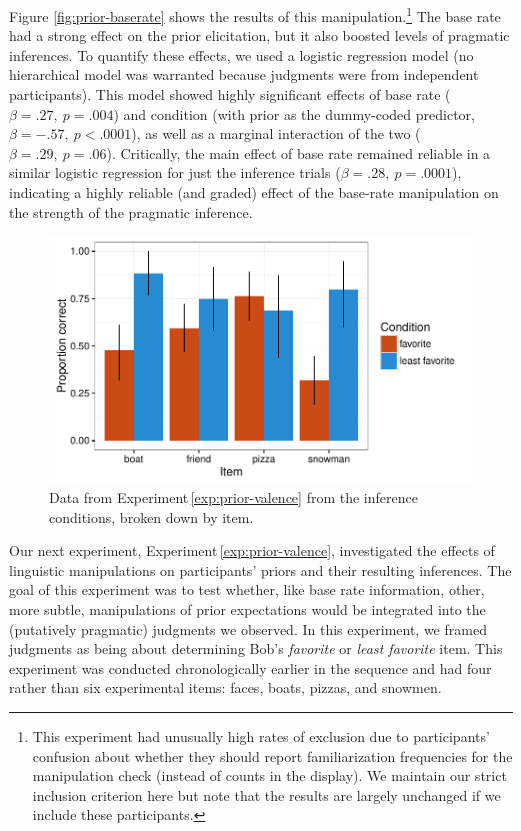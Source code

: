 \documentclass[man,noapacite]{apa2}
\newcounter{Experiment}
\newcommand{\exptref}[1]{Experiment\,\ref{#1}}
\begin{document}
Figure \ref{fig:prior-baserate} shows the results of this manipulation.\footnote{This experiment had unusually high rates of exclusion due to participants' confusion about whether they should report familiarization frequencies for the manipulation check (instead of counts in the display). We maintain our strict inclusion criterion here but note that the results are largely unchanged if we include these participants.}  The base rate had a strong effect on the prior elicitation, but it also boosted levels of pragmatic inferences. To quantify these effects, we used a logistic regression model (no hierarchical model was warranted because judgments were from independent participants). This model showed highly significant effects of base rate ($\beta = .27,~p = .004$) and condition (with prior as the dummy-coded predictor, $\beta = -.57,~p < .0001$), as well as a marginal interaction of the two  ($\beta = .29,~p = .06$). Critically, the main effect of base rate remained reliable in a similar logistic regression for just the inference trials ($\beta = .28,~p = .0001$), indicating a highly reliable (and graded) effect of the base-rate manipulation on the strength of the pragmatic inference.


\begin{figure}[t]
  \centering
  \includegraphics[width=6in]{../plots/2-prior-valence-items.pdf}
  \caption{\label{fig:prior-valence} Data from \exptref{exp:prior-valence} from the inference conditions, broken down by item.}
\end{figure}

Our next experiment, \exptref{exp:prior-valence}, investigated the effects of linguistic manipulations on participants' priors and their resulting inferences. The goal of this experiment was to test whether, like base rate information, other, more subtle, manipulations of prior expectations would be integrated into the (putatively pragmatic) judgments we observed. In this experiment, we framed judgments as being about determining Bob's \emph{favorite} or \emph{least favorite} item. This experiment was conducted chronologically earlier in the sequence and had four rather than six experimental items: faces, boats, pizzas, and snowmen.
\end{document}
